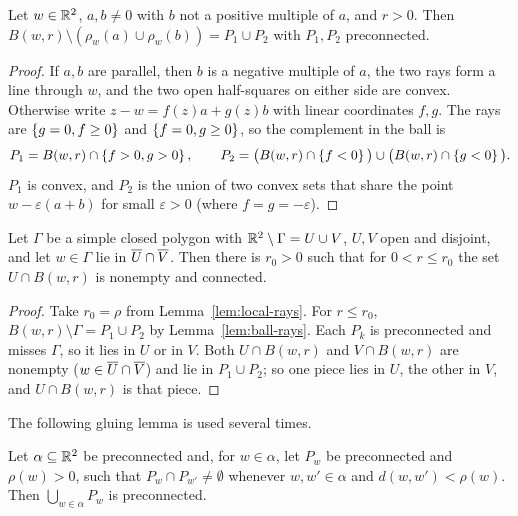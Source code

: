 
\begin{lemma}\label{lem:ball-rays}
Let $w\in\mathbb{R}^2$, $a,b\neq0$ with $b$ not a positive multiple of $a$, and $r>0$. Then
$B(w,r)\setminus(\rho_w(a)\cup\rho_w(b))=P_1\cup P_2$ with $P_1,P_2$ preconnected.
\end{lemma}

\begin{proof}
If $a,b$ are parallel, then $b$ is a negative multiple of $a$, the two rays form a line through $w$,
and the two open half-squares on either side are convex. Otherwise write
$z-w=f(z)a+g(z)b$ with linear coordinates $f,g$. The rays are $\left\{ g=0,f\ge0 \right\}$ and
$\left\{ f=0,g\ge0 \right\}$, so the complement in the ball is
\[
P_1=B(w,r)\cap\left\{ f>0,g>0 \right\},\qquad P_2=\big(B(w,r)\cap\left\{ f<0 \right\}\big)\cup\big(B(w,r)\cap\left\{ g<0 \right\}\big).
\]
$P_1$ is convex, and $P_2$ is the union of two convex sets that share the point
$w-\varepsilon(a+b)$ for small $\varepsilon>0$ (where $f=g=-\varepsilon$).
\end{proof}


\begin{lemma}\label{lem:local-side}
Let $\Gamma$ be a simple closed polygon with $\mathbb{R}^2\setminus\Gamma=U\cup V$, $U,V$ open and
disjoint, and let $w\in\Gamma$ lie in $\overline{U}\cap\overline{V}$. Then there is $r_0>0$ such that for
$0<r\le r_0$ the set $U\cap B(w,r)$ is nonempty and connected.
\end{lemma}

\begin{proof}
Take $r_0=\rho$ from Lemma~\ref{lem:local-rays}. For $r\le r_0$, $B(w,r)\setminus\Gamma=P_1\cup P_2$
by Lemma~\ref{lem:ball-rays}. Each $P_k$ is preconnected and misses $\Gamma$, so it lies in $U$ or
in $V$. Both $U\cap B(w,r)$ and $V\cap B(w,r)$ are nonempty ($w\in\overline{U}\cap\overline{V}$) and lie in
$P_1\cup P_2$; so one piece lies in $U$, the other in $V$, and $U\cap B(w,r)$ is that piece.
\end{proof}


The following gluing lemma is used several times.

\begin{lemma}\label{lem:local-meet}
Let $\alpha\subseteq\mathbb{R}^2$ be preconnected and, for $w\in\alpha$, let $P_w$ be preconnected and
$\rho(w)>0$, such that $P_w\cap P_{w'}\neq\emptyset$ whenever $w,w'\in\alpha$ and $d(w,w')<\rho(w)$.
Then $\bigcup_{w\in\alpha}P_w$ is preconnected.
\end{lemma}

